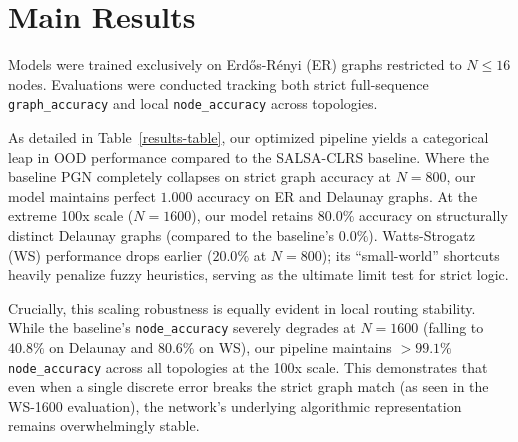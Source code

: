 \documentclass{article}
\begin{document}
\section{Main Results}

Models were trained exclusively on Erd\H{o}s-R\'{e}nyi (ER) graphs restricted to $N \le 16$ nodes. Evaluations were conducted tracking both strict full-sequence \texttt{graph\_accuracy} and local \texttt{node\_accuracy} across topologies.

As detailed in Table~\ref{results-table}, our optimized pipeline yields a categorical leap in OOD performance compared to the SALSA-CLRS baseline. Where the baseline PGN completely collapses on strict graph accuracy at $N=800$, our model maintains perfect $1.000$ accuracy on ER and Delaunay graphs. At the extreme 100x scale ($N=1600$), our model retains $80.0\%$ accuracy on structurally distinct Delaunay graphs (compared to the baseline's $0.0\%$). Watts-Strogatz (WS) performance drops earlier ($20.0\%$ at $N=800$); its ``small-world'' shortcuts heavily penalize fuzzy heuristics, serving as the ultimate limit test for strict logic.

Crucially, this scaling robustness is equally evident in local routing stability. While the baseline's \texttt{node\_accuracy} severely degrades at $N=1600$ (falling to $40.8\%$ on Delaunay and $80.6\%$ on WS), our pipeline maintains $>99.1\%$ \texttt{node\_accuracy} across all topologies at the 100x scale. This demonstrates that even when a single discrete error breaks the strict graph match (as seen in the WS-1600 evaluation), the network's underlying algorithmic representation remains overwhelmingly stable.
\end{document}
